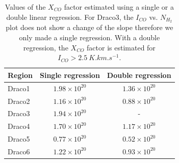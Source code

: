 \documentclass[traditabstract]{aa}
\begin{document}
\begin{table}[h]
  \centering
  \footnotesize
  \begin{tabular}{lcc}
    \hline \hline
    Region &  Single regression   &  Double regression   \\ \hline 
    Draco1 & $1.98\times 10^{20}$ & $1.36\times 10^{20}$ \\
    Draco2 & $1.16\times 10^{20}$ & $0.88\times 10^{20}$ \\
    Draco3 & $1.94\times 10^{20}$ &          -           \\
    Draco4 & $1.70\times 10^{20}$ & $1.17\times 10^{20}$ \\
    Draco5 & $0.77\times 10^{20}$ & $0.52\times 10^{20}$ \\
    Draco6 & $1.22\times 10^{20}$ & $0.93\times 10^{20}$ \\ \hline
  \end{tabular}
  \caption{\label{table:Xco} Values of the $X_{CO}$ factor estimated using a single or a double linear regression. For Draco3, the $I_{CO}$ vs. $N_{H_2}$ plot does not show a change of the slope therefore we only made a single regression. With a double regression, the $X_{CO}$ factor is estimated for $I_{CO}>2.5\: K.km.s^{-1}$.}
\end{table}
\end{document}
